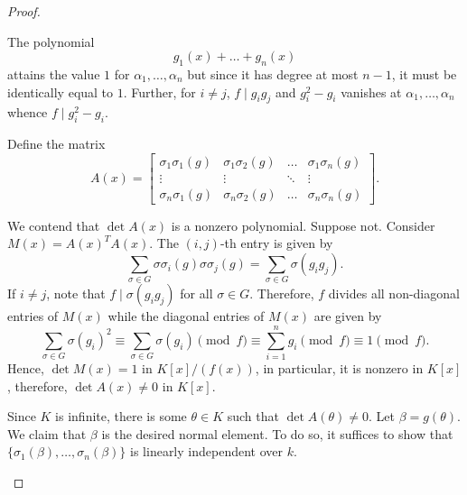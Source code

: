 \begin{proof}
\begin{description}
    The polynomial 
    \begin{equation*}
        g_1(x) + \dots + g_n(x)
    \end{equation*}
    attains the value $1$ for $\alpha_1,\dots,\alpha_n$ but since it has degree at most $n - 1$, it must be identically equal to $1$. Further, for $i\ne j$, $f\mid g_ig_j$ and $g_i^2 - g_i$ vanishes at $\alpha_1,\dots,\alpha_n$ whence $f\mid g_i^2 - g_i$.

    Define the matrix 
    \begin{equation*}
        A(x) = 
        \begin{bmatrix}
            \sigma_1\sigma_1(g) & \sigma_1\sigma_2(g) & \dots & \sigma_1\sigma_n(g)\\
            \vdots & \vdots & \ddots & \vdots\\
            \sigma_n\sigma_1(g) & \sigma_n\sigma_2(g) & \dots & \sigma_n\sigma_n(g)
        \end{bmatrix}.
    \end{equation*}

    We contend that $\det A(x)$ is a nonzero polynomial. Suppose not. Consider $M(x) = A(x)^TA(x)$. The $(i,j)$-th entry is given by 
    \begin{equation*}
        \sum_{\sigma\in G}\sigma\sigma_i(g)\sigma\sigma_j(g) = \sum_{\sigma\in G}\sigma(g_ig_j).
    \end{equation*}
    If $i\ne j$, note that $f\mid\sigma(g_ig_j)$ for all $\sigma\in G$. Therefore, $f$ divides all non-diagonal entries of $M(x)$ while the diagonal entries of $M(x)$ are given by 
    \begin{equation*}
        \sum_{\sigma\in G}\sigma(g_i)^2\equiv\sum_{\sigma\in G}\sigma(g_i)\pmod{f}\equiv\sum_{i = 1}^n g_i\pmod{f}\equiv 1\pmod{f}.
    \end{equation*}
    Hence, $\det M(x) = 1$ in $K[x]/(f(x))$, in particular, it is nonzero in $K[x]$, therefore, $\det A(x)\ne 0$ in $K[x]$.

    Since $K$ is infinite, there is some $\theta\in K$ such that $\det A(\theta)\ne 0$. Let $\beta = g(\theta)$. We claim that $\beta$ is the desired normal element. To do so, it suffices to show that $\{\sigma_1(\beta),\dots,\sigma_n(\beta)\}$ is linearly independent over $k$.


\end{description}
\end{proof}
